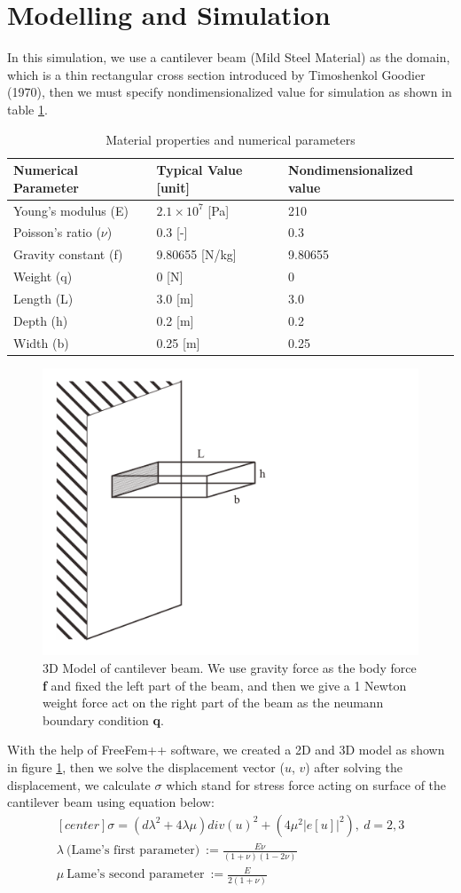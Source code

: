 \documentclass[a4paper,11pt]{article}
\begin{document}
\section{Modelling and Simulation}
In this simulation, we use a cantilever beam (Mild Steel Material) as the domain, which is a thin rectangular cross section introduced by Timoshenkol Goodier (1970), then we must specify nondimensionalized value for simulation as shown in table \ref{parametertable}.
\begin{table}[h!]
	\centering
	\begin{tabular}{|l|l|l|}
		\hline
		Numerical Parameter & Typical Value [unit] & Nondimensionalized value\\
		\hline
		Young's modulus (E) & $2.1 \times 10^7$ [Pa] & 210\\
		Poisson's ratio ($\nu$) & 0.3 [-] & 0.3\\
		Gravity constant (f) & 9.80655 [N/kg] & 9.80655\\
		Weight (q) & 0 [N] & 0\\
		Length (L) & 3.0 [m] & 3.0\\
		Depth (h) & 0.2 [m] & 0.2\\
		Width (b) & 0.25 [m] & 0.25\\
		\hline
	\end{tabular}
\caption{Material properties and numerical parameters}
\label{parametertable}
\end{table}
\newline
\begin{figure}[h!]
	\centering
	\includegraphics[width=0.5\linewidth]{picture/3dmodellinearelasticity}
	\caption{3D Model of cantilever beam. We use gravity force as the body force \textbf{f} and fixed the left part of the beam, and then we give a 1 Newton weight force act on the right part of the beam as the neumann boundary condition \textbf{q}.}
	\label{fig:3dmodel}
\end{figure}
With the help of FreeFem++ software, we created a 2D and 3D model as shown in figure \ref{fig:3dmodel}, then we solve the displacement vector ($u$, $v$) after solving the displacement, we calculate $\sigma$ which stand for stress force acting on surface of the cantilever beam using equation below:
\begin{equation*}
\begin{aligned}[center]
\sigma = (d \lambda^2 + 4\lambda\mu)div(u)^2 + (4\mu^2 |e[u]|^2),\ d=2,3\\
\lambda\ \text{(Lame's first parameter)}\ := \frac{E\nu}{(1+\nu)(1-2\nu)}\\
\mu\ \text{Lame's second parameter}\ := \frac{E}{2(1+\nu)}
\end{aligned}
\end{equation*}
\newpage
\end{document}
